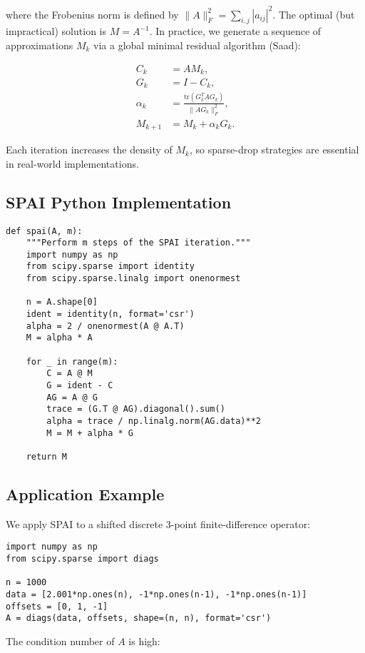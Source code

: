 \documentclass[11pt,a4paper]{book}
\begin{document}
where the Frobenius norm is defined by \(\|A\|_F^2 = \sum_{i,j} |a_{ij}|^2\). The optimal (but impractical) solution is \(M = A^{-1}\). In practice, we generate a sequence of approximations \(M_k\) via a global minimal residual algorithm (Saad):

\[
\begin{aligned}
C_k &= A M_k,\\
G_k &= I - C_k,\\
\alpha_k &= \frac{\mathrm{tr}(G_k^T A G_k)}{\|A G_k\|_F^2},\\
M_{k+1} &= M_k + \alpha_k G_k.
\end{aligned}
\]

Each iteration increases the density of \(M_k\), so sparse-drop strategies are essential in real-world implementations.

\subsection*{SPAI Python Implementation}
\begin{lstlisting}
def spai(A, m):
    """Perform m steps of the SPAI iteration."""
    import numpy as np
    from scipy.sparse import identity
    from scipy.sparse.linalg import onenormest

    n = A.shape[0]
    ident = identity(n, format='csr')
    alpha = 2 / onenormest(A @ A.T)
    M = alpha * A

    for _ in range(m):
        C = A @ M
        G = ident - C
        AG = A @ G
        trace = (G.T @ AG).diagonal().sum()
        alpha = trace / np.linalg.norm(AG.data)**2
        M = M + alpha * G

    return M
\end{lstlisting}

\subsection*{Application Example}
We apply SPAI to a shifted discrete 3-point finite-difference operator:

\begin{lstlisting}
import numpy as np
from scipy.sparse import diags

n = 1000
data = [2.001*np.ones(n), -1*np.ones(n-1), -1*np.ones(n-1)]
offsets = [0, 1, -1]
A = diags(data, offsets, shape=(n, n), format='csr')
\end{lstlisting}

The condition number of \(A\) is high:
\end{document}
